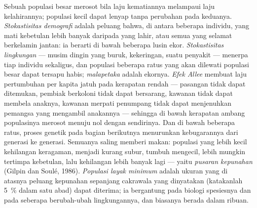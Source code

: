 \begin{definition}\label{def:b3:conservation-biology:small}
%
Sebuah populasi besar merosot bila laju kematiannya melampaui
laju kelahirannya; populasi kecil dapat lenyap tanpa perubahan pada keduanya.
\emph{Stokastisitas demografi} adalah peluang bahwa, di antara beberapa
individu, yang mati kebetulan lebih banyak daripada yang lahir, atau semua
yang selamat berkelamin jantan: ia berarti di bawah beberapa lusin ekor.
\emph{Stokastisitas lingkungan} --- musim dingin yang buruk, kekeringan,
suatu penyakit --- menerpa tiap individu sekaligus, dan populasi beberapa
ratus yang akan dilewati populasi besar dapat tersapu habis;
\emph{malapetaka} adalah ekornya. \emph{Efek Allee} membuat laju
pertumbuhan per kapita jatuh pada kerapatan rendah --- pasangan tidak
dapat ditemukan, pembiak berkoloni tidak dapat bersarang, kawanan tidak
dapat membela anaknya, kawanan merpati penumpang tidak dapat menjenuhkan
pemangsa yang mengambil anakannya --- sehingga di bawah kerapatan ambang
populasinya merosot menuju nol dengan sendirinya. Dan di bawah beberapa
ratus, proses genetik pada bagian berikutnya menurunkan kebugarannya dari
generasi ke generasi. Semuanya saling memberi makan: populasi yang lebih
kecil kehilangan keragaman, menjadi kurang subur, tumbuh mengecil, lebih
mungkin tertimpa kebetulan, lalu kehilangan lebih banyak lagi --- yaitu
\emph{pusaran kepunahan} (Gilpin dan Soulé, 1986). \emph{Populasi layak
minimum} adalah ukuran yang di atasnya peluang kepunahan sepanjang
cakrawala yang dinyatakan (katakanlah \qty{5}{\%} dalam satu abad) dapat
diterima; ia bergantung pada biologi spesiesnya dan pada seberapa
berubah-ubah lingkungannya, dan biasanya berada dalam ribuan.
\end{definition}


